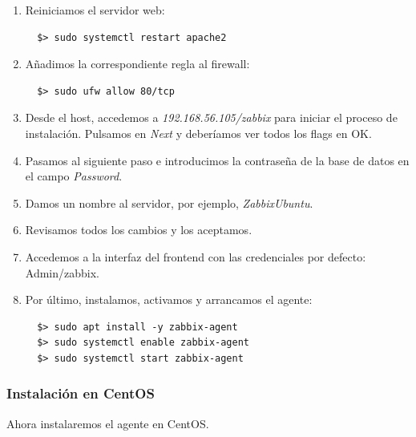 \documentclass[12pt,spanish]{article}
\begin{document}
\begin{enumerate}
\begin{lstlisting}
  \end{lstlisting}
  Buscamos el texto [Date] y lo modificamos:
  \begin{lstlisting}
  [Date]
  date.timezone="Europe/Madrid"
  \end{lstlisting}
  \item Reiniciamos el servidor web:
  \begin{lstlisting}
  $> sudo systemctl restart apache2
  \end{lstlisting}
  \item Añadimos la correspondiente regla al firewall:
  \begin{lstlisting}
  $> sudo ufw allow 80/tcp
  \end{lstlisting}
  \item Desde el host, accedemos  a \textit{192.168.56.105/zabbix} para iniciar el proceso de instalación. Pulsamos en \textit{Next} y deberíamos ver todos los flags en OK.
  \item Pasamos al siguiente paso e introducimos la contraseña de la base de datos en el campo \textit{Password}.
  \item Damos un nombre al servidor, por ejemplo, \textit{ZabbixUbuntu}.
  \item Revisamos todos los cambios y los aceptamos.
  \item Accedemos a la interfaz del frontend con las credenciales por defecto: Admin/zabbix.
  \item Por último, instalamos, activamos y arrancamos el agente:
  \begin{lstlisting}
  $> sudo apt install -y zabbix-agent
  $> sudo systemctl enable zabbix-agent
  $> sudo systemctl start zabbix-agent
  \end{lstlisting}

\end{enumerate}

\subsubsection{Instalación en CentOS}

Ahora instalaremos el agente en CentOS.
\end{document}

